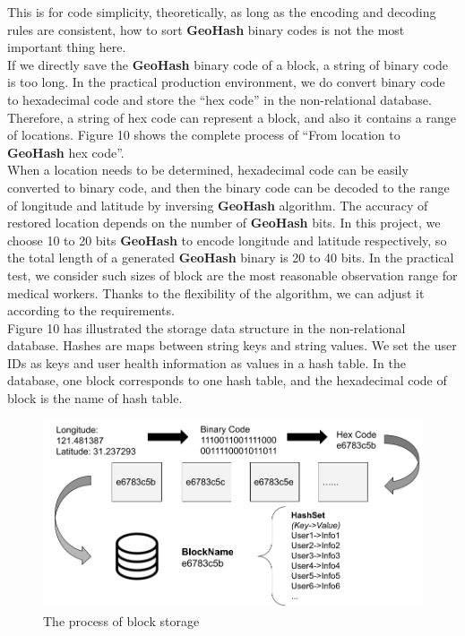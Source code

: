 \documentclass[sigplan,screen]{acmart}
\begin{document}
This is for code simplicity, theoretically, as long as the encoding and decoding rules are consistent, how to sort \textbf{GeoHash} binary codes is not the most important thing here.
\\
If we directly save the \textbf{GeoHash} binary code of a block, a string of binary code is too long.
In the practical production environment, we do convert binary code to hexadecimal code and store the ``hex code'' in the non-relational database.
Therefore, a string of hex code can represent a block, and also it contains a range of locations.
Figure 10 shows the complete process of ``From location to \textbf{GeoHash} hex code''.
\\
When a location needs to be determined, hexadecimal code can be easily converted to binary code, and then the binary code can be decoded to the range of longitude and latitude by inversing \textbf{GeoHash} algorithm.
The accuracy of restored location depends on the number of \textbf{GeoHash} bits.
In this project, we choose 10 to 20 bits \textbf{GeoHash} to encode longitude and latitude respectively, so the total length of a generated \textbf{GeoHash} binary is 20 to 40 bits.
In the practical test, we consider such sizes of block are the most reasonable observation range for medical workers.
Thanks to the flexibility of the algorithm, we can adjust it according to the requirements.
\\
Figure 10 has illustrated the storage data structure in the non-relational database.
Hashes are maps between string keys and string values.
We set the user IDs as keys and user health information as values in a hash table.
In the database, one block corresponds to one hash table, and the hexadecimal code of block is the name of hash table.
\begin{figure}[htb]
	\centering\includegraphics[width=\linewidth]{block-storage.png}
	\caption{The process of block storage}
\end{figure}
\end{document}
